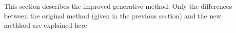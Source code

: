 This section describes the improved generative method. Only the differences between the original method (given in the previous section) and the new methhod are explained here. 